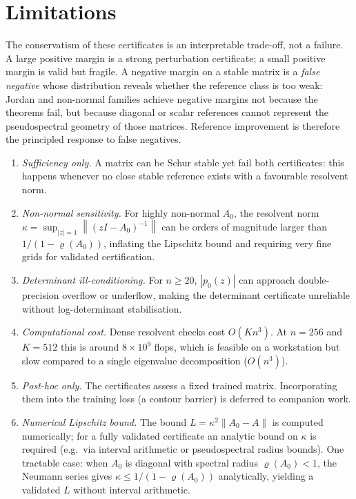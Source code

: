 \documentclass{article}
\theoremstyle{definition}
\newcommand{\norm}[1]{\left\|#1\right\|}
\begin{document}
\section{Limitations}
\label{sec:limitations}

The conservatism of these certificates is an interpretable trade-off, not a
failure.  A large positive margin is a strong perturbation certificate; a small
positive margin is valid but fragile.  A negative margin on a stable matrix is a
\emph{false negative} whose distribution reveals whether the reference class is
too weak: Jordan and non-normal families achieve negative margins not because
the theorems fail, but because diagonal or scalar references cannot represent
the pseudospectral geometry of those matrices.  Reference improvement is
therefore the principled response to false negatives.

\begin{enumerate}
  \item \emph{Sufficiency only.}  A matrix can be Schur stable yet fail both
    certificates: this happens whenever no close stable reference exists with
    a favourable resolvent norm.
  \item \emph{Non-normal sensitivity.}  For highly non-normal $A_0$, the
    resolvent norm $\kappa = \sup_{|z|=1}\norm{(zI-A_0)^{-1}}$ can be orders
    of magnitude larger than $1/(1-\varrho(A_0))$, inflating the Lipschitz
    bound and requiring very fine grids for validated certification.
  \item \emph{Determinant ill-conditioning.}  For $n \geq 20$, $|p_0(z)|$
    can approach double-precision overflow or underflow, making the
    determinant certificate unreliable without log-determinant stabilisation.
  \item \emph{Computational cost.}  Dense resolvent checks cost $O(Kn^3)$.
    At $n = 256$ and $K = 512$ this is around $8 \times 10^9$ flops, which
    is feasible on a workstation but slow compared to a single eigenvalue
    decomposition ($O(n^3)$).
  \item \emph{Post-hoc only.}  The certificates assess a fixed trained matrix.
    Incorporating them into the training loss (a contour barrier) is deferred
    to companion work.
  \item \emph{Numerical Lipschitz bound.}  The bound $L = \kappa^2 \norm{A_0 - A}$
    is computed numerically; for a fully validated certificate an analytic
    bound on $\kappa$ is required (e.g.\ via interval arithmetic or pseudospectral
    radius bounds).  One tractable case: when $A_0$ is diagonal with spectral radius
    $\varrho(A_0) < 1$, the Neumann series gives $\kappa \leq 1/(1-\varrho(A_0))$
    analytically, yielding a validated $L$ without interval arithmetic.
\end{enumerate}
\end{document}
